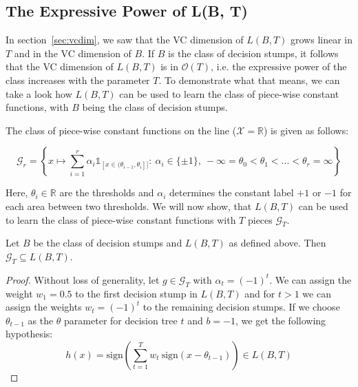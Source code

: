 \subsection{The Expressive Power of L(B, T)}

In section~\ref{sec:vcdim}, we saw that the VC dimension of $L(B, T)$ grows linear in $T$ and in the VC dimension of
$B$. If $B$ is the class of decision stumps, it follows that the VC dimension
of $L(B, T)$ is in $\mathcal{O}(T)$, i.e. the expressive power of the class increases with the parameter $T$.
To demonstrate what that means, we can take a look how $L(B, T)$ can be used to learn the class of piece-wise constant
functions, with $B$ being the class of decision stumps.

The class of piece-wise constant functions on the line ($\mathcal{X} = \mathbb{R}$) is given as follows:
\begin{linenomath*}
    $$
    \mathcal{G}_r = \left \{ x \mapsto \sum_{i=1}^r \alpha_i \mathds{1}_{[x \in (\theta_{i-1}, \theta_i]]}: \ 
        \alpha_i \in \{\pm 1 \},\  -\infty = \theta_0 < \theta_1 < ... < \theta_r = \infty \right \}
    $$
\end{linenomath*}
Here, $\theta_i \in \mathbb{R}$ are the thresholds and $\alpha_i$ determines the constant label $+1$ or $-1$
for each area between two thresholds. We will now show, that $L(B, T)$ can be used to learn the class
of piece-wise constant functions with $T$ pieces $\mathcal{G}_T$.

\begin{theorem}
\label{thm:piece-wise}
\begin{linenomath*}
	Let $B$ be the class of decision stumps and $L(B, T)$ as defined above.
	Then $\mathcal{G}_T \subseteq L(B, T)$.
\end{linenomath*}
\end{theorem}
\begin{proof}
	Without loss of generality, let $g \in \mathcal{G}_T$ with $\alpha_t = (-1)^t$. We can assign the weight
	$w_1=0.5$ to the first decision stump in $L(B, T)$ and for $t > 1$ we can assign the weights $w_t = (-1)^t$
	to the remaining decision stumps. If we choose $\theta_{t-1}$ as the $\theta$ parameter for decision
	tree $t$ and $b=-1$, we get the following hypothesis:
	$$
	    h(x) = \text{sign} \left( \sum_{t=1}^T w_t \  \text{sign} (x - \theta_{t-1}) \right) \in L(B, T)
	$$
\end{proof}